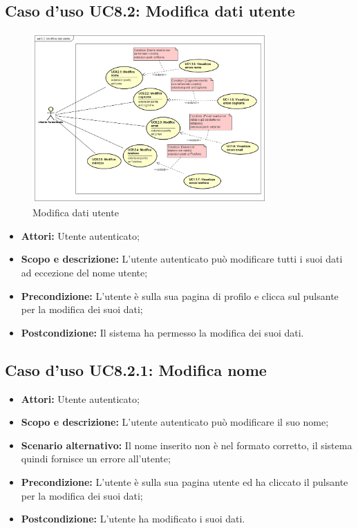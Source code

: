 \documentclass[12pt,a4paper,titlepage]{article}
\begin{document}
	\subsection{Caso d'uso UC8.2: Modifica dati utente}
	\label{UC8.2}
	\begin{figure}[H]
		\centering
		\includegraphics[width=0.8\textwidth]{UseCase/ModificaDatiUtente}
		\caption{Modifica dati utente}
	\end{figure}
	\begin{itemize}
		\item \textbf{Attori: }Utente autenticato;
		\item \textbf{Scopo e descrizione: }L'utente autenticato può modificare tutti i suoi dati ad eccezione del nome utente;
		\item \textbf{Precondizione: }L'utente è sulla sua pagina di profilo e clicca sul pulsante per la modifica dei suoi dati;
		\item \textbf{Postcondizione: }Il sistema ha permesso la modifica dei suoi dati.
	\end{itemize}
	\subsection{Caso d'uso UC8.2.1: Modifica nome}
	\label{UC8.2.1}
	\begin{itemize}
		\item \textbf{Attori: }Utente autenticato;
		\item \textbf{Scopo e descrizione: }L'utente autenticato può modificare il suo nome;
		\item \textbf{Scenario alternativo: }Il nome inserito non è nel formato corretto, il sistema quindi fornisce un errore all'utente;
		\item \textbf{Precondizione: }L'utente è sulla sua pagina utente ed ha cliccato il pulsante per la modifica dei suoi dati;
		\item \textbf{Postcondizione: }L'utente ha modificato i suoi dati.
	\end{itemize}
\end{document}
